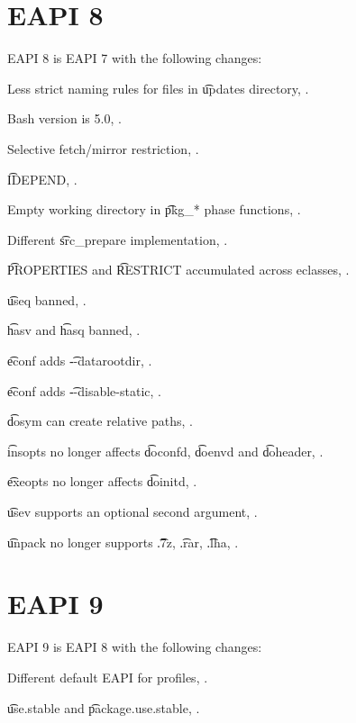 \section*{EAPI 8}

EAPI 8 is EAPI 7 with the following changes:

\begin{compactitem}
\item Less strict naming rules for files in \t{updates} directory, .
\item Bash version is 5.0, .
\item Selective fetch/mirror restriction, .
\item \t{IDEPEND}, .
\item Empty working directory in \t{pkg_*} phase functions, .
\item Different \t{src_prepare} implementation, .
\item \t{PROPERTIES} and \t{RESTRICT} accumulated across eclasses, .
\item \t{useq} banned, .
\item \t{hasv} and \t{hasq} banned, .
\item \t{econf} adds \t{-{}-datarootdir}, .
\item \t{econf} adds \t{-{}-disable-static}, .
\item \t{dosym} can create relative paths, .
\item \t{insopts} no longer affects \t{doconfd}, \t{doenvd} and \t{doheader}, .
\item \t{exeopts} no longer affects \t{doinitd}, .
\item \t{usev} supports an optional second argument, .
\item \t{unpack} no longer supports \t{.7z}, \t{.rar}, \t{.lha}, .
\end{compactitem}

\section*{EAPI 9}

EAPI 9 is EAPI 8 with the following changes:

\begin{compactitem}
\item Different default EAPI for profiles, .
\item \t{use.stable} and \t{package.use.stable}, .
\end{compactitem}



